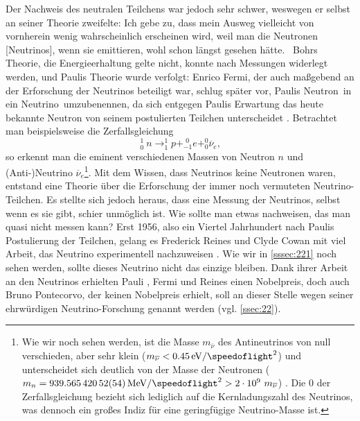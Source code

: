 \documentclass[a4paper,12pt]{article}
\newcommand{\figref}[1]{Abb.~\ref{#1}}
\begin{document}
Der Nachweis des neutralen Teilchens war jedoch sehr schwer, weswegen er selbst an seiner Theorie zweifelte: \glqq Ich gebe zu, dass mein Ausweg vielleicht von vornherein wenig wahrscheinlich erscheinen wird, weil man die Neutronen [Neutrinos], wenn sie emittieren, wohl schon längst gesehen hätte.\grqq \ \cite[2]{Pauli} Bohrs Theorie, die Energieerhaltung gelte nicht, konnte nach Messungen widerlegt werden, und Paulis Theorie wurde verfolgt: Enrico Fermi, der auch maßgebend an der Erforschung der Neutrinos beteiligt war, schlug später vor, Paulis \glqq Neutron\grqq \ in ein \glqq Neutrino\grqq \ umzubenennen, da sich entgegen Paulis Erwartung das heute bekannte Neutron von seinem postulierten Teilchen unterscheidet \cite{Fermi1934}. 
Betrachtet man beispielsweise die Zerfallsgleichung 
\begin{equation}
^1_0 \ n \rightarrow ^1_1p +_{-1}^{\hspace{4pt} 0}e + ^0_0 \overline{\nu}_e \text{,}
\label{eq:betaminuszerfall}
\end{equation}
so erkennt man die eminent verschiedenen Massen von Neutron $n$ und (Anti-)Neutrino $\overline{\nu}_e$\footnote{Wie wir noch sehen werden, ist die Masse $m_{\overline{\nu}}$ des Antineutrinos von null verschieden, aber sehr klein ($m_{\overline{\nu}}<\qty[per-mode=symbol]{,45}{\electronvolt\per\square\speedoflight}$) \cite[180]{Aker2025} und unterscheidet sich deutlich von der Masse der Neutronen ($m_n=\qty[per-mode=symbol]{939,56542052(54)}{\mega\electronvolt\per\square\speedoflight} > 2 \cdot 10^9 \ m_{\overline{\nu}}$) \cite[1347]{Tipler2024}. Die $0$ der Zerfallsgleichung bezieht sich lediglich auf die Kernladungszahl des Neutrinos, was dennoch ein großes Indiz für eine geringfügige Neutrino-Masse ist.}.
Mit dem Wissen, dass Neutrinos keine Neutronen waren, entstand eine Theorie über die Erforschung der immer noch vermuteten Neutrino-Teilchen. Es stellte sich jedoch heraus, dass eine Messung der Neutrinos, selbst wenn es sie gibt, schier unmöglich ist. Wie sollte man etwas nachweisen, das man quasi nicht messen kann? Erst 1956, also ein Viertel Jahrhundert nach Paulis Postulierung der Teilchen, gelang es Frederick Reines und Clyde Cowan mit viel Arbeit, das Neutrino experimentell nachzuweisen \cite{Cowan1956}. Wie wir in \cref{sssec:221} noch sehen werden, sollte dieses Neutrino nicht das einzige bleiben. Dank ihrer Arbeit an den Neutrinos erhielten Pauli \cite{NPOa}, Fermi \cite{NPOc} und Reines \cite{NPOb} einen Nobelpreis, doch auch Bruno Pontecorvo, der keinen Nobelpreis erhielt, soll an dieser Stelle wegen seiner ehrwürdigen Neutrino-Forschung genannt werden (vgl. \cref{ssec:22}).
\end{document}
